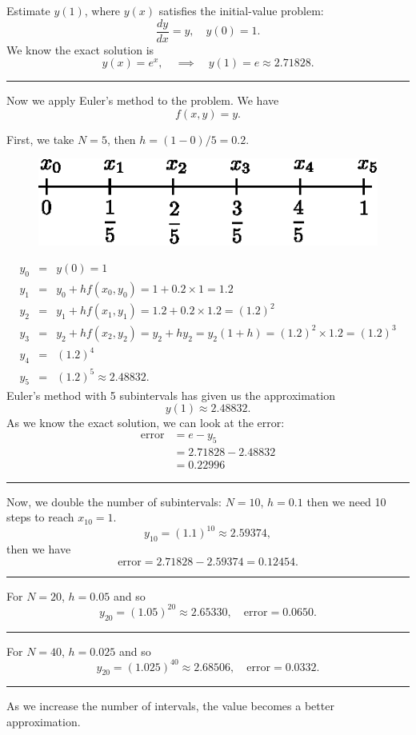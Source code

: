 \begin{example}
Estimate $y(1)$, where $y(x)$ satisfies the initial-value problem: \[\frac{dy}{dx}=y,\quad y(0)=1.\] We 
know the exact solution is \[y(x)=e^x,\quad \implies\quad y(1)=e\approx2.71828.\]

\hrule
\vspace{2mm}

Now we apply Euler's method to the problem. We have 
\[f(x,y)=y.\]

First, we take $N=5$, then $h=(1-0)/5=0.2$. 

\begin{figure}[H]
\centering
\includegraphics[scale=1.0]{img/subintervals-5}
\end{figure}
\begin{eqnarray*}
y_0 &=& y(0)=1 \\
y_1 &=& y_0+hf(x_0,y_0)=1+0.2\times1=1.2 \\
y_2 &=& y_1+hf(x_1,y_1)=1.2+0.2\times1.2=(1.2)^2 \\
y_3 &=& y_2 + hf(x_2,y_2)=y_2+hy_2=y_2(1+h)=(1.2)^2\times1.2=(1.2)^3 \\
y_4 &=& (1.2)^4 \\
y_5 &=& (1.2)^5\approx2.48832.
\end{eqnarray*}
Euler's method with 5 subintervals has given us the approximation \[y(1)\approx2.48832.\]
As we know the exact solution, we can look at the error:
\begin{align*}
\text{error}&=e-y_5\\&=2.71828-2.48832\\&=0.22996
\end{align*}

\hrule
\vspace{2mm}

Now, we double the number of subintervals: $N=10$, $h=0.1$ then we need 10 steps to reach $x_{10}=1$.
\[y_{10}=(1.1)^{10}\approx2.59374,\]
then we have
\[\text{error} = 2.71828-2.59374=0.12454.\]

\hrule
\vspace{2mm}

For $N=20$, $h=0.05$ and so
\[y_{20}=(1.05)^{20}\approx2.65330,\quad \text{error}=0.0650.\]

\hrule
\vspace{2mm}

For $N=40$, $h=0.025$ and so
\[y_{20}=(1.025)^{40}\approx2.68506,\quad \text{error}=0.0332.\]

\hrule
\vspace{2mm}

As we increase the number of intervals, the value becomes a better approximation.

\end{example}
